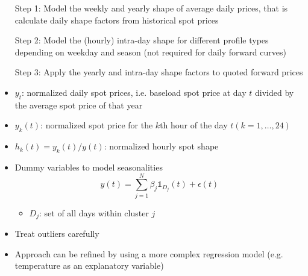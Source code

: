 \documentclass{beamer}
\begin{document}
\begin{frame}
    \begin{itemize}
        \item[Step 1:] Model the weekly and yearly shape of average daily prices, that is calculate daily shape factors from historical spot prices

        \item[Step 2:] Model the (hourly) intra-day shape for different profile types depending on weekday and season (not required for daily forward curves)

        \item[Step 3:] Apply the yearly and intra-day shape factors to quoted forward prices
    \end{itemize}
\end{frame}


\begin{frame}
    \begin{itemize}
        \item $y_t$: normalized daily spot prices, i.e. baseload spot price at day $t$ divided by the average spot price of that year

        \item $y_k(t)$: normalized spot price for the $k$th hour of the day $t (k = 1, \ldots, 24)$

        \item $h_k(t) = y_k(t) / y(t)$: normalized hourly spot shape

        \item Dummy variables to model seasonalities
              \[
                  y(t)
                  = \sum_{j = 1}^N \beta_j \mathds{1}_{D_j}(t) + \epsilon(t)
              \]
              \begin{itemize}
                  \item $D_j$: set of all days within cluster $j$
              \end{itemize}

        \item Treat outliers carefully

        \item Approach can be refined by using a more complex regression model (e.g. temperature as an explanatory variable)
    \end{itemize}
\end{frame}
\end{document}
